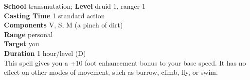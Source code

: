 \textbf{School} transmutation; \textbf{Level} druid 1, ranger 1\\
\textbf{Casting Time} 1 standard action\\
\textbf{Components} V, S, M (a pinch of dirt)\\
\textbf{Range} personal\\
\textbf{Target} you\\
\textbf{Duration} 1 hour/level (D)\\
This spell gives you a +10 foot enhancement bonus to your base speed. It has no effect on other modes of movement, such as burrow, climb, fly, or swim.\\
